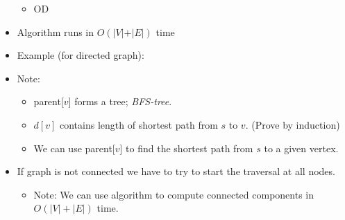 \begin{itemize}
{{\begin{itemize}
\begin{itemize}
					\begin{itemize}
						\item[] IF color[$v$] = white THEN
						\item[] ~~~~color[$v$] = gray
						\item[] ~~~~$d[v] = d[u] + 1$
						\item[] ~~~~parent[$v$] = u
						\item[] ~~~~ENQUEUE($Q,v$)
						\item[] FI
						\item[] color[$u$] = black
					\end{itemize}
				\end{itemize}
				\item[] OD
			\end{itemize}
	}}
	\vspace*{\baselineskip}
	
	\item Algorithm runs in $O(\vert V \vert + \vert E \vert)$ time
	
	
	\item Example (for directed graph): \\
	\item Note:
	\begin{itemize}
		\item parent[$v$] forms a tree; {\em BFS-tree}.
		\item $d[v]$ contains length of shortest path from $s$ to
		$v$. (Prove by induction)
		\item We can use parent[$v$] to find the shortest path from $s$ to a
		given vertex.
	\end{itemize}
	\item If graph is not connected we have to try to start the traversal
	at all nodes. \\
	
	
	\begin{itemize}
		\item Note: We can use algorithm to compute connected components in
		$O(|V|+|E|)$ time.
	\end{itemize}
\end{itemize}



